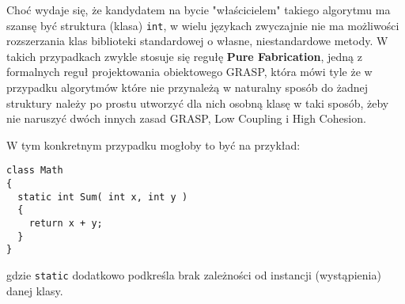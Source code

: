 Choć wydaje się, że kandydatem na bycie "właścicielem" takiego algorytmu ma szansę być struktura (klasa) {\tt int},
w wielu językach zwyczajnie nie ma możliwości rozszerzania klas biblioteki standardowej o własne, niestandardowe metody.
W takich przypadkach zwykle stosuje się regułę {\bf Pure Fabrication}, jedną z formalnych reguł projektowania obiektowego 
GRASP, która mówi tyle że w przypadku algorytmów które nie przynależą w naturalny sposób do żadnej struktury należy
po prostu utworzyć dla nich osobną klasę w taki sposób, żeby nie naruszyć dwóch innych zasad GRASP, Low Coupling i 
High Cohesion. 

W tym konkretnym przypadku mogłoby to być na przykład:

\begin{scriptsize}
\begin{verbatim}
class Math
{
  static int Sum( int x, int y )
  {
    return x + y;
  }
}
\end{verbatim}
\end{scriptsize}

gdzie {\tt static} dodatkowo podkreśla brak zależności od instancji (wystąpienia) danej klasy.